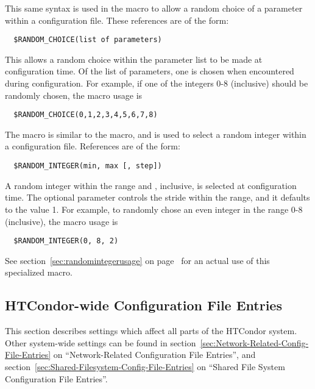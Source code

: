 This same syntax is used in the  macro to
allow a random choice of a parameter
within a configuration file.
These references are of the form:
\begin{verbatim}
  $RANDOM_CHOICE(list of parameters)
\end{verbatim}
This allows a random choice within the parameter list to be made
at configuration time.  Of the list of parameters, one is
chosen when encountered during configuration.  For example,
if one of the integers 0-8 (inclusive) should be randomly
chosen, the macro usage is
\begin{verbatim}
  $RANDOM_CHOICE(0,1,2,3,4,5,6,7,8)
\end{verbatim}

The  macro is similar to the 
macro, and is used to select a random integer within a configuration file.
References are of the form:
\begin{verbatim}
  $RANDOM_INTEGER(min, max [, step])
\end{verbatim}
A random integer within the range \verb@min@ and \verb@max@, inclusive,
is selected at configuration time.
The optional \verb@step@ parameter
controls the stride within the range, and it defaults to the value 1.
For example, to randomly chose an even integer in the range 0-8 (inclusive),
the macro usage is
\begin{verbatim}
  $RANDOM_INTEGER(0, 8, 2)
\end{verbatim}

See section~\ref{sec:randomintegerusage} on
page~\pageref{sec:randomintegerusage}
for an actual use of this specialized macro.
\subsection{\label{sec:HTCondor-wide-Config-File-Entries}HTCondor-wide Configuration File Entries} 


This section describes settings which affect all parts of the HTCondor
system. 
Other system-wide settings can be found in
section~\ref{sec:Network-Related-Config-File-Entries} on
``Network-Related Configuration File Entries'', and
section~\ref{sec:Shared-Filesystem-Config-File-Entries} on ``Shared
File System Configuration File Entries''. 

